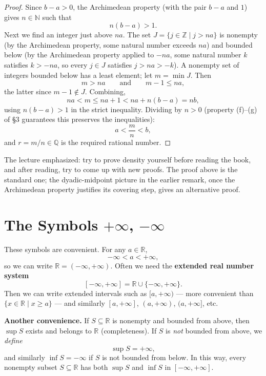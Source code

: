 \documentclass[11pt]{report}
\begin{document}
\begin{proof}
Since $b - a > 0$, the Archimedean property (with the pair $b-a$ and $1$) gives $n \in \mathbb{N}$ such that
\[
n(b - a) > 1.
\]
Next we find an integer just above $na$. The set $J = \{j \in \mathbb{Z} \mid j > na\}$ is nonempty (by the Archimedean property, some natural number exceeds $na$) and bounded below (by the Archimedean property applied to $-na$, some natural number $k$ satisfies $k > -na$, so every $j \in J$ satisfies $j > na > -k$). A nonempty set of integers bounded below has a least element; let $m = \min J$. Then
\[
m > na \qquad \text{and} \qquad m - 1 \leq na,
\]
the latter since $m - 1 \notin J$. Combining,
\[
na < m \leq na + 1 < na + n(b-a) = nb,
\]
using $n(b-a) > 1$ in the strict inequality. Dividing by $n > 0$ (property (f)--(g) of \S 3 guarantees this preserves the inequalities):
\[
a < \frac{m}{n} < b,
\]
and $r = m/n \in \mathbb{Q}$ is the required rational number.
\end{proof}

\begin{rembox}
The lecture emphasized: try to prove density yourself before reading the book, and after reading, try to come up with new proofs. The proof above is the standard one; the dyadic-midpoint picture in the earlier remark, once the Archimedean property justifies its covering step, gives an alternative proof.
\end{rembox}


\section{The Symbols $+\infty$, $-\infty$}

These symbols are convenient. For any $a \in \mathbb{R}$,
\[
-\infty < a < +\infty,
\]
so we can write $\mathbb{R} = (-\infty, +\infty)$. Often we need the \textbf{extended real number system}
\[
[-\infty, +\infty] = \mathbb{R} \cup \{-\infty, +\infty\}.
\]
Then we can write extended intervals such as $[a, +\infty)$ --- more convenient than $\{x \in \mathbb{R} \mid x \geq a\}$ --- and similarly $[a, +\infty]$, $(a, +\infty)$, $(a, +\infty]$, etc.

\textbf{Another convenience.} If $S \subseteq \mathbb{R}$ is nonempty and bounded from above, then $\sup S$ exists and belongs to $\mathbb{R}$ (completeness). If $S$ is \emph{not} bounded from above, we \emph{define}
\[
\sup S = +\infty,
\]
and similarly $\inf S = -\infty$ if $S$ is not bounded from below. In this way, every nonempty subset $S \subseteq \mathbb{R}$ has both $\sup S$ and $\inf S$ in $[-\infty, +\infty]$.
\end{document}
